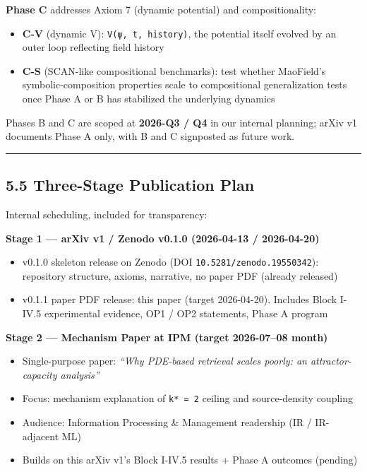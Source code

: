 \documentclass[
]{article}
\providecommand{\tightlist}{%
  \setlength{\itemsep}{0pt}\setlength{\parskip}{0pt}}
\begin{document}
\textbf{Phase C} addresses Axiom 7 (dynamic potential) and
compositionality:

\begin{itemize}
\tightlist
\item
  \textbf{C-V} (dynamic V): \texttt{V(ψ,\ t,\ history)}, the potential
  itself evolved by an outer loop reflecting field history
\item
  \textbf{C-S} (SCAN-like compositional benchmarks): test whether
  MaoField's symbolic-composition properties scale to compositional
  generalization tests once Phase A or B has stabilized the underlying
  dynamics
\end{itemize}

Phases B and C are scoped at \textbf{2026-Q3 / Q4} in our internal
planning; arXiv v1 documents Phase A only, with B and C signposted as
future work.

\begin{center}\rule{0.5\linewidth}{0.5pt}\end{center}

\hypertarget{three-stage-publication-plan}{%
\subsection{5.5 Three-Stage Publication
Plan}\label{three-stage-publication-plan}}

Internal scheduling, included for transparency:

\textbf{Stage 1 --- arXiv v1 / Zenodo v0.1.0 (2026-04-13 / 2026-04-20)}

\begin{itemize}
\tightlist
\item
  v0.1.0 skeleton release on Zenodo (DOI
  \texttt{10.5281/zenodo.19550342}): repository structure, axioms,
  narrative, no paper PDF (already released)
\item
  v0.1.1 paper PDF release: this paper (target 2026-04-20). Includes
  Block I-IV.5 experimental evidence, OP1 / OP2 statements, Phase A
  program
\end{itemize}

\textbf{Stage 2 --- Mechanism Paper at IPM (target 2026-07--08 month)}

\begin{itemize}
\tightlist
\item
  Single-purpose paper: \emph{``Why PDE-based retrieval scales poorly:
  an attractor-capacity analysis''}
\item
  Focus: mechanism explanation of \texttt{k*\ =\ 2} ceiling and
  source-density coupling
\item
  Audience: Information Processing \& Management readership (IR /
  IR-adjacent ML)
\item
  Builds on this arXiv v1's Block I-IV.5 results + Phase A outcomes
  (pending)
\end{itemize}
\end{document}
